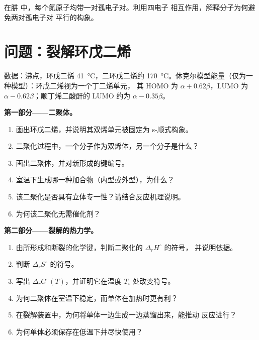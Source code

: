 \begin{exercise}[$\star\star\star$]\label{exo:b2:frontier-orbitals:12}
在肼  中，每个氮原子均带一对孤电子对。利用四电子
相互作用，解释分子为何避免两对孤电子对
平行的构象。
\end{exercise}

\section{问题：裂解环戊二烯}

\begin{problem}
\label{pb:b2:frontier-orbitals:1}
数据：沸点，环戊二烯 \qty{41}{\degreeCelsius}，二环戊二烯约
\qty{170}{\degreeCelsius}。休克尔模型能量（仅为一种模型）：环戊二烯视为一个丁二烯单元，
其 HOMO 为 $\alpha + 0.62\beta$，LUMO 为 $\alpha - 0.62\beta$；顺丁烯二酸酐的 LUMO
约为 $\alpha - 0.35\beta$。

\medskip
\noindent\textbf{第一部分——二聚体。}
\begin{enumerate}
  \item 画出环戊二烯，并说明其双烯单元被固定为 s-顺式构象。
  \item 二聚化过程中，一个分子作为双烯体，另一个分子是什么？
  \item 画出二聚体，并对新形成的键编号。
  \item 室温下生成哪一种加合物（内型或外型），为什么？
  \item 该二聚化是否具有立体专一性？请结合反应机理说明。
  \item 为何该二聚化无需催化剂？
\end{enumerate}

\medskip
\noindent\textbf{第二部分——裂解的热力学。}
\begin{enumerate}[resume]
  \item 由所形成和断裂的化学键，判断二聚化的 $\Delta_r H^\circ$ 的符号，
        并说明依据。
  \item 判断 $\Delta_r S^\circ$ 的符号。
  \item 写出 $\Delta_r G^\circ(T)$，并证明它在温度 $T_i$ 处改变符号。
  \item 为何二聚体在室温下稳定，而单体在加热时更有利？
  \item 在裂解装置中，为何将单体一边生成一边蒸馏出来，能推动
        反应进行？
  \item 为何单体必须保存在低温下并尽快使用？
\end{enumerate}


\end{problem}
